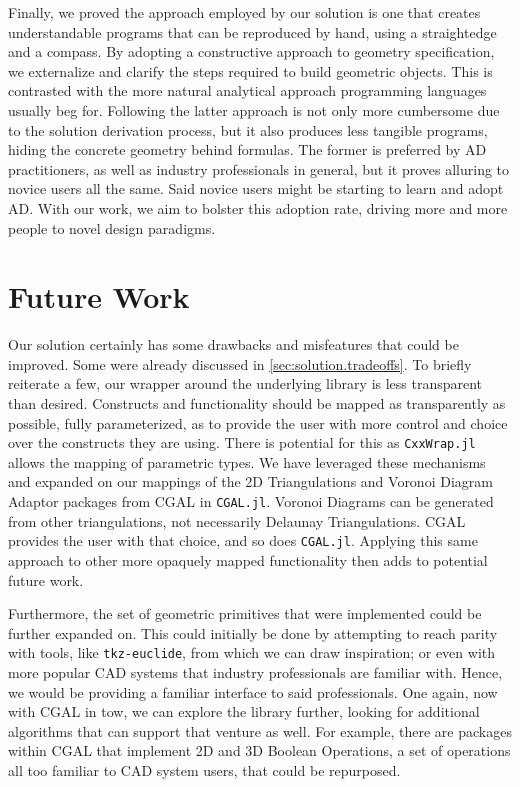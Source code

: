 Finally, we proved the approach employed by our solution is one that creates
understandable programs that can be reproduced by hand, using a straightedge and
a compass.  By adopting a constructive approach to geometry specification, we
externalize and clarify the steps required to build geometric objects.  This is
contrasted with the more natural analytical approach programming languages
usually beg for.  Following the latter approach is not only more cumbersome due
to the solution derivation process, but it also produces less tangible programs,
hiding the concrete geometry behind formulas.  The former is preferred by
\ac{AD} practitioners, as well as industry professionals in general, but it
proves alluring to novice users all the same.  Said novice users might be
starting to learn and adopt \ac{AD}.  With our work, we aim to bolster this
adoption rate, driving more and more people to novel design paradigms.

\section*{Future Work}

Our solution certainly has some drawbacks and misfeatures that could be
improved.  Some were already discussed in \cref{sec:solution.tradeoffs}.  To
briefly reiterate a few, our wrapper around the underlying library is less
transparent than desired.  Constructs and functionality should be mapped as
transparently as possible, fully parameterized, as to provide the user with more
control and choice over the constructs they are using.  There is potential for
this as \texttt{CxxWrap.jl} allows the mapping of parametric types.  We have
leveraged these mechanisms and expanded on our mappings of the 2D Triangulations
and Voronoi Diagram Adaptor packages from \ac{CGAL} in \texttt{CGAL.jl}.
Voronoi Diagrams can be generated from other triangulations, not necessarily
Delaunay Triangulations.  \Ac{CGAL} provides the user with that choice, and so
does \texttt{CGAL.jl}.  Applying this same approach to other more opaquely
mapped functionality then adds to potential future work.

Furthermore, the set of geometric primitives that were implemented could be
further expanded on.  This could initially be done by attempting to reach parity
with tools, like \texttt{tkz-euclide}, from which we can draw inspiration; or
even with more popular \ac{CAD} systems that industry professionals are familiar
with.  Hence, we would be providing a familiar interface to said professionals.
One again, now with \ac{CGAL} in tow, we can explore the library further,
looking for additional algorithms that can support that venture as well.  For
example, there are packages within \ac{CGAL} that implement 2D and 3D Boolean
Operations, a set of operations all too familiar to \ac{CAD} system users, that
could be repurposed.

